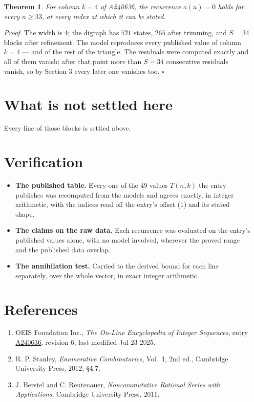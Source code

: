\documentclass[11pt]{article}
\newtheorem{theorem}{Theorem}
\theoremstyle{definition}
\begin{document}
\begin{theorem} For column $k = 4$ of A240636, the recurrence $a(n) = 0$ holds for every $n \ge 33$, at every index at which it can be stated.\end{theorem}

{\itshape Proof.} The width is $4$; the digraph has $521$ states, $265$ after trimming, and $S = 34$ blocks after refinement. The model reproduces every published value of column $k = 4$ --- and of the rest of the triangle. The residuals were computed exactly and all of them vanish; after that point more than $S = 34$ consecutive residuals vanish, so by Section 3 every later one vanishes too. $\square$

\section{What is not settled here}

Every line of those blocks is settled above.

\section{Verification}

\begin{itemize}

\item {\bfseries The published table.} Every one of the 49 values $T(n,k)$ the entry publishes was recomputed from the models and agrees exactly, in integer arithmetic, with the indices read off the entry's offset (1) and its stated shape.

\item {\bfseries The claims on the raw data.} Each recurrence was evaluated on the entry's published values alone, with no model involved, wherever the proved range and the published data overlap.

\item {\bfseries The annihilation test.} Carried to the derived bound for each line separately, over the whole vector, in exact integer arithmetic.

\end{itemize}

\section{References}

\begin{enumerate}

\item OEIS Foundation Inc., \emph{The On-Line Encyclopedia of Integer Sequences}, entry \href{https://oeis.org/A240636}{A240636}, revision 6, last modified Jul 23 2025.

\item R. P. Stanley, \emph{Enumerative Combinatorics}, Vol.~1, 2nd ed., Cambridge University Press, 2012; \S4.7.

\item J. Berstel and C. Reutenauer, \emph{Noncommutative Rational Series with Applications}, Cambridge University Press, 2011.

\end{enumerate}
\end{document}
